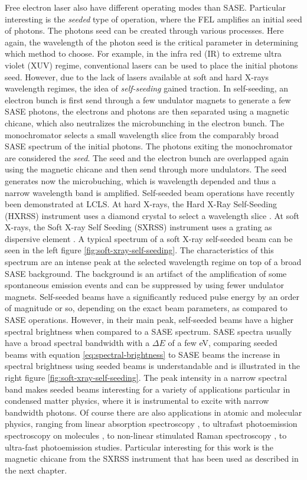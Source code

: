 Free electron laser also have different operating modes than SASE. Particular interesting is the \textit{seeded} type of operation, where the FEL amplifies an initial seed of photons. The photons seed can be created through various processes. Here again, the wavelength of the photon seed is the critical parameter in determining which method to choose. For example, in the infra red (IR) to extreme ultra violet (XUV) regime, conventional lasers can be used to place the initial photons seed. However, due to the lack of lasers available at soft and hard X-rays wavelength regimes, the idea of \textit{self-seeding} gained traction. In self-seeding, an electron bunch is first send through a few undulator magnets to generate a few SASE photons, the electrons and photons are then separated using a magnetic chicane, which also neutralizes the microbunching in the electron bunch. The monochromator selects a small wavelength slice from the comparably broad SASE spectrum of the initial photons. The photons exiting the monochromator are considered the \textit{seed}. The seed and the electron bunch are overlapped again using the magnetic chicane and then send through more undulators. The seed generates now the microbuching, which is wavelength depended and thus a narrow wavelength band is amplified. Self-seeded beam operations have recently been demonstrated at LCLS. At hard X-rays, the Hard X-Ray Self-Seeding (HXRSS) instrument uses a diamond crystal to select a wavelength slice \citep{Amann-2012-NatPho}. At soft X-rays, the Soft X-ray Self Seeding (SXRSS) instrument uses a grating as dispersive element \citep{Ratner-2015-PRL}. A typical spectrum of a soft X-ray self-seeded beam can be seen in the left figure \ref{fig:soft-xray-self-seeding}. The characteristics of this spectrum are an intense peak at the selected wavelength regime on top of a broad SASE background. The background is an artifact of the amplification of some spontaneous emission events and can be suppressed by using fewer undulator magnets. Self-seeded beams have a significantly reduced pulse energy by an order of magnitude or so, depending on the exact beam parameters, as compared to SASE operations. However, in their main peak, self-seeded beams have a higher spectral brightness when compared to a SASE spectrum. SASE spectra usually have a broad spectral bandwidth with a $\Delta E$ of a few eV, comparing seeded beams with equation \ref{eq:spectral-brightness} to SASE beams the increase in spectral brightness using seeded beams is understandable and is illustrated in the right figure \ref{fig:soft-xray-self-seeding}. The peak intensity in a narrow spectral band makes seeded beams interesting for a variety of applications particular in condensed matter physics, where it is instrumental to excite with narrow bandwidth photons. Of course there are also applications in atomic and molecular physics, ranging from linear absorption spectroscopy \citep{Ferguson-2014-Unpublished}, to ultrafast photoemission spectroscopy on molecules \citep{Bucher-2014-Unpublished}, to non-linear stimulated Raman spectroscopy \citep{Kimberg-2016-FD}, to ultra-fast photoemission studies. Particular interesting for this work is the magnetic chicane from the SXRSS instrument that has been used as described in the next chapter.
